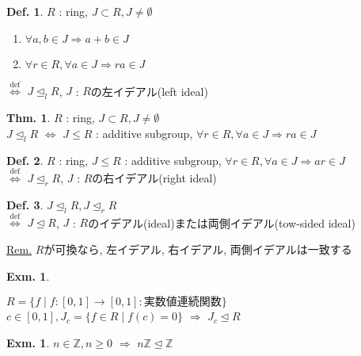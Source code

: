 \documentclass[uplatex,dvipdfmx,9pt]{beamer}
\newcommand{\defarrow}{\overset{\mathrm{def}}{\Leftrightarrow}}
\newcommand{\lideal}{\trianglelefteq_l}
\newcommand{\rideal}{\trianglelefteq_r}
\newcommand{\ideal}{\trianglelefteq}
\newcommand{\Z}{\mathbb{Z}}
\newcounter{textExmCount}
\theoremstyle{definition} %
\newtheorem{defn}{Def.}[subsection] %
\newtheorem{thm}{Thm.}[subsection] %
\theoremstyle{example}
\newtheorem{exmText}[textExmCount]{Exm.}
\begin{document}
    \begin{frame}

      \begin{defn}
        $R$ : ring, $J \subset R, J \neq \emptyset$
        \begin{enumerate}
          \item $\forall a, b \in J \Rightarrow a + b \in J$
          \item $\forall r \in R, \forall a \in J \Rightarrow ra \in J$
        \end{enumerate}
        $\defarrow$ $J \lideal R$, $J$ : $R$の\alert{左イデアル(left ideal)}
      \end{defn}

      \begin{thm}
        $R$ : ring, $J \subset R, J \neq \emptyset$ \\
        $J \lideal R$ $\Leftrightarrow$ $J \le R$ : additive subgroup, $\forall r \in R, \forall a \in J \Rightarrow ra \in J$
      \end{thm}

      \begin{defn}
        $R$ : ring, $J \le R$ : additive subgroup, $\forall r \in R, \forall a \in J \Rightarrow ar \in J$ \\
        $\defarrow$ $J \rideal R$, $J$ : $R$の\alert{右イデアル(right ideal)}
      \end{defn}

    \end{frame}

    \begin{frame}

      \begin{defn}
        $J \lideal R, J \rideal R$ \\
        $\defarrow$ $J \ideal R$, $J$ : $R$の\alert{イデアル(ideal)}または\alert{両側イデアル(tow-sided ideal)}
      \end{defn}
      \underline{Rem.} $R$が可換なら, 左イデアル, 右イデアル, 両側イデアルは一致する
 
      \begin{exmText}
        \hypertarget{exmText3-1}{}
        $R = \{f \mid f\colon [0,1] \to [0,1] : \text{実数値連続関数}\}$ \\
        $c \in [0,1], J_c = \{f \in R \mid f(c) = 0\}$ $\Rightarrow$ $J_c \ideal R$
      \end{exmText}

      \begin{exmText}
        $n \in \Z, n \ge 0$ $\Rightarrow$ $n\Z \ideal \Z$
      \end{exmText}

    \end{frame}
\end{document}
